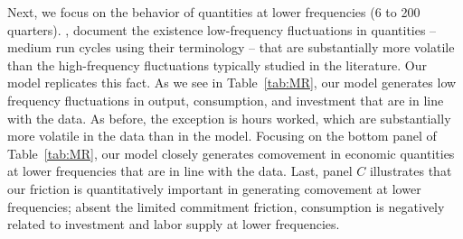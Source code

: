\documentclass[12pt]{article}
\newcommand{\cn}{\citet}
\begin{document}
Next, we focus on the behavior of quantities at lower frequencies (6 to 200 quarters). \cn{CominGertler2006}, document the existence low-frequency fluctuations in quantities -- medium run cycles using their terminology -- that are substantially more volatile than the high-frequency fluctuations typically studied in the literature. Our model replicates this fact. As we see in Table~\ref{tab:MR}, our model generates low frequency fluctuations in output, consumption, and investment that are in line with the data. As before, the exception is hours worked, which are substantially more volatile in the data than in the model. Focusing on the bottom panel of Table~\ref{tab:MR}, our model closely generates comovement in economic quantities at lower frequencies that are in line with the data. Last, panel $C$ illustrates that our friction is quantitatively important in generating comovement at lower frequencies; absent the limited commitment friction, consumption is negatively related to investment and labor supply at lower frequencies.
\end{document}

